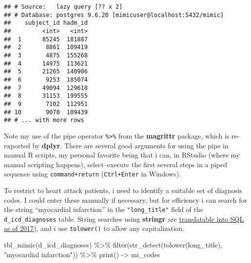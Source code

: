 \documentclass[
]{article}
\newenvironment{Shaded}{\begin{snugshade}}{\end{snugshade}}
\newcommand{\FunctionTok}[1]{\textcolor[rgb]{0.00,0.00,0.00}{#1}}
\newcommand{\NormalTok}[1]{#1}
\newcommand{\OtherTok}[1]{\textcolor[rgb]{0.56,0.35,0.01}{#1}}
\newcommand{\SpecialCharTok}[1]{\textcolor[rgb]{0.00,0.00,0.00}{#1}}
\newcommand{\StringTok}[1]{\textcolor[rgb]{0.31,0.60,0.02}{#1}}
\begin{document}
\begin{verbatim}
## # Source:   lazy query [?? x 2]
## # Database: postgres 9.6.20 [mimicuser@localhost:5432/mimic]
##    subject_id hadm_id
##         <int>   <int>
##  1      85245  181887
##  2       8861  109419
##  3       4875  155268
##  4      14975  113621
##  5      21265  140906
##  6       9253  185074
##  7      49094  129618
##  8      31153  199555
##  9       7102  112951
## 10       9070  109439
## # ... with more rows
\end{verbatim}

Note my use of the pipe operator \texttt{\%\textgreater{}\%} from the
\textbf{magrittr} package, which is re-exported by \textbf{dplyr}. There
are several good arguments for using the pipe in manual R scripts, my
personal favorite being that i can, in RStudio (where my manual
scripting happens), select--execute the first several steps in a piped
sequence using \texttt{command+return} (\texttt{Ctrl+Enter} in Windows).

To restrict to heart attack patients, i need to identify a suitable set
of diagnosis codes. I could enter these manually if necessary, but for
efficiency i can search for the string ``myocardial infarction'' in the
\texttt{"long\_title"} field of the \texttt{d\_icd\_diagnoses} table.
String searches using \textbf{stringr} are
\href{https://github.com/tidyverse/dbplyr/pull/35}{translatable into SQL
as of 2017}), and i use \texttt{tolower()} to allow any capitalization.

\begin{Shaded}
\begin{Highlighting}[]
\FunctionTok{tbl\_mimic}\NormalTok{(d\_icd\_diagnoses) }\SpecialCharTok{\%\textgreater{}\%}
  \FunctionTok{filter}\NormalTok{(}\FunctionTok{str\_detect}\NormalTok{(}\FunctionTok{tolower}\NormalTok{(long\_title), }\StringTok{"myocardial infarction"}\NormalTok{)) }\SpecialCharTok{\%\textgreater{}\%}
  \FunctionTok{print}\NormalTok{() }\OtherTok{{-}\textgreater{}}\NormalTok{ mi\_codes}
\end{Highlighting}
\end{Shaded}
\end{document}
